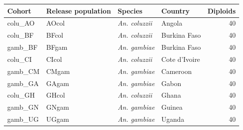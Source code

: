 \begin{tabular}{llllr}
\toprule
Cohort & Release population & Species & Country & Diploids \\
\midrule
colu\_AO & AOcol & \textit{An. coluzzii} & Angola & 40 \\
colu\_BF & BFcol & \textit{An. coluzzii} & Burkina Faso & 40 \\
gamb\_BF & BFgam & \textit{An. gambiae} & Burkina Faso & 40 \\
colu\_CI & CIcol & \textit{An. coluzzii} & Cote d'Ivoire & 40 \\
gamb\_CM & CMgam & \textit{An. gambiae} & Cameroon & 40 \\
gamb\_GA & GAgam & \textit{An. gambiae} & Gabon & 40 \\
colu\_GH & GHcol & \textit{An. coluzzii} & Ghana & 40 \\
gamb\_GN & GNgam & \textit{An. gambiae} & Guinea & 40 \\
gamb\_UG & UGgam & \textit{An. gambiae} & Uganda & 40 \\
\bottomrule
\end{tabular}
